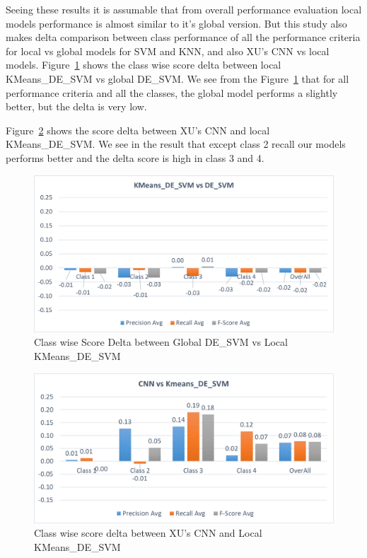 \documentclass[sigconf]{acmart}
\theoremstyle{break}
\begin{document}
    Seeing these results it is assumable that from overall performance evaluation local models performance is almost similar to it's global version. But this study also makes delta comparison between class performance of all the performance criteria for local vs global models for SVM and KNN, and also XU's CNN vs local models. Figure~\ref{fig:Global_vs_Local_DE_SVM} shows the class wise score delta between local KMeans\_DE\_SVM vs global DE\_SVM. We see from the Figure~\ref{fig:Global_vs_Local_DE_SVM} that for all performance criteria and all the classes, the global model performs a slightly better, but the delta is very low.
    
    Figure~\ref{fig:CNN_vs_KMeans_DE_SVM} shows the score delta between XU's CNN and local KMeans\_DE\_SVM. We see in the result that except class 2 recall our models performs better and the delta score is high in class 3 and 4.

    \begin{figure}
        \centering
        \includegraphics[width=\linewidth]{fig/de_vs_KMenas.png}
        \caption{Class wise Score Delta between Global DE\_SVM vs Local KMeans\_DE\_SVM}
        \label{fig:Global_vs_Local_DE_SVM}
    \end{figure}
    
    \begin{figure}
        \centering
        \includegraphics[width=\linewidth]{fig/cnn_vs_Kmeans.png}
        \caption{Class wise score delta between XU's CNN and Local KMeans\_DE\_SVM}
        \label{fig:CNN_vs_KMeans_DE_SVM}
    \end{figure}
    
\end{document}
